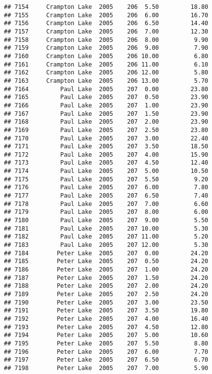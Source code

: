 \documentclass[
]{article}
\begin{document}
\begin{verbatim}
## 7154     Crampton Lake  2005    206  5.50         18.80
## 7155     Crampton Lake  2005    206  6.00         16.70
## 7156     Crampton Lake  2005    206  6.50         14.40
## 7157     Crampton Lake  2005    206  7.00         12.30
## 7158     Crampton Lake  2005    206  8.00          9.90
## 7159     Crampton Lake  2005    206  9.00          7.90
## 7160     Crampton Lake  2005    206 10.00          6.80
## 7161     Crampton Lake  2005    206 11.00          6.10
## 7162     Crampton Lake  2005    206 12.00          5.80
## 7163     Crampton Lake  2005    206 13.00          5.70
## 7164         Paul Lake  2005    207  0.00         23.80
## 7165         Paul Lake  2005    207  0.50         23.90
## 7166         Paul Lake  2005    207  1.00         23.90
## 7167         Paul Lake  2005    207  1.50         23.90
## 7168         Paul Lake  2005    207  2.00         23.90
## 7169         Paul Lake  2005    207  2.50         23.80
## 7170         Paul Lake  2005    207  3.00         22.40
## 7171         Paul Lake  2005    207  3.50         18.50
## 7172         Paul Lake  2005    207  4.00         15.90
## 7173         Paul Lake  2005    207  4.50         12.40
## 7174         Paul Lake  2005    207  5.00         10.50
## 7175         Paul Lake  2005    207  5.50          9.20
## 7176         Paul Lake  2005    207  6.00          7.80
## 7177         Paul Lake  2005    207  6.50          7.40
## 7178         Paul Lake  2005    207  7.00          6.60
## 7179         Paul Lake  2005    207  8.00          6.00
## 7180         Paul Lake  2005    207  9.00          5.50
## 7181         Paul Lake  2005    207 10.00          5.30
## 7182         Paul Lake  2005    207 11.00          5.20
## 7183         Paul Lake  2005    207 12.00          5.30
## 7184        Peter Lake  2005    207  0.00         24.20
## 7185        Peter Lake  2005    207  0.50         24.20
## 7186        Peter Lake  2005    207  1.00         24.20
## 7187        Peter Lake  2005    207  1.50         24.20
## 7188        Peter Lake  2005    207  2.00         24.20
## 7189        Peter Lake  2005    207  2.50         24.20
## 7190        Peter Lake  2005    207  3.00         23.50
## 7191        Peter Lake  2005    207  3.50         19.80
## 7192        Peter Lake  2005    207  4.00         16.40
## 7193        Peter Lake  2005    207  4.50         12.80
## 7194        Peter Lake  2005    207  5.00         10.60
## 7195        Peter Lake  2005    207  5.50          8.80
## 7196        Peter Lake  2005    207  6.00          7.70
## 7197        Peter Lake  2005    207  6.50          6.70
## 7198        Peter Lake  2005    207  7.00          5.90

\end{verbatim}
\end{document}
